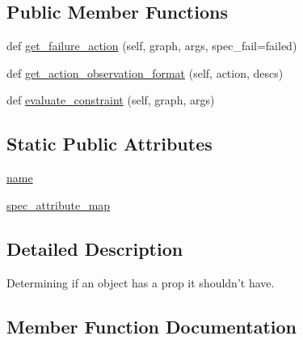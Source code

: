 \subsection*{Public Member Functions}
\begin{DoxyCompactItemize}
\item 
def \hyperlink{classlight__chats_1_1graph_1_1NoPropConstraint_ad9fd1275af02f384bd55ceaebc6ee59c}{get\+\_\+failure\+\_\+action} (self, graph, args, spec\+\_\+fail=\textquotesingle{}failed\textquotesingle{})
\item 
def \hyperlink{classlight__chats_1_1graph_1_1NoPropConstraint_a7d3ef98c6d1eea452e44c426a9498015}{get\+\_\+action\+\_\+observation\+\_\+format} (self, action, descs)
\item 
def \hyperlink{classlight__chats_1_1graph_1_1NoPropConstraint_a9a109d3e7b10297b01d79409838be126}{evaluate\+\_\+constraint} (self, graph, args)
\end{DoxyCompactItemize}
\subsection*{Static Public Attributes}
\begin{DoxyCompactItemize}
\item 
\hyperlink{classlight__chats_1_1graph_1_1NoPropConstraint_a203bf64e3c9ae237a63a23a893df6a0f}{name}
\item 
\hyperlink{classlight__chats_1_1graph_1_1NoPropConstraint_a10464e1a8f8bc8216bd0d36c9cdd38dd}{spec\+\_\+attribute\+\_\+map}
\end{DoxyCompactItemize}


\subsection{Detailed Description}
\begin{DoxyVerb}Determining if an object has a prop it shouldn't have.
\end{DoxyVerb}
 

\subsection{Member Function Documentation}
\mbox{\label{classlight__chats_1_1graph_1_1NoPropConstraint_a9a109d3e7b10297b01d79409838be126}} 
